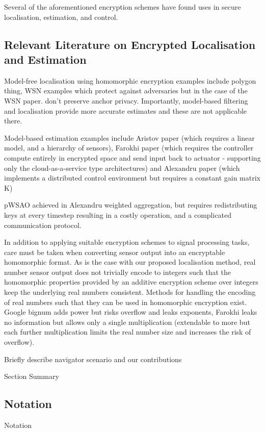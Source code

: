 \documentclass[twocolumn]{autart}    %
\begin{document}
Several of the aforementioned encryption schemes have found uses in secure localisation, estimation, and control.

\subsection{Relevant Literature on Encrypted Localisation and Estimation}

Model-free localisation using homomorphic encryption examples include polygon thing, WSN examples which protect against adversaries but in the case of the WSN paper. don't preserve anchor privacy. Importantly, model-based filtering and localisation provide more accurate estimates and these are not applicable there.

Model-based estimation examples include Aristov paper (which requires a linear model, and a hierarchy of sensors), Farokhi paper (which requires the controller compute entirely in encrypted space and send input back to actuator - supporting only the cloud-as-a-service type architectures) and Alexandru paper (which implements a distributed control environment but requires a constant gain matrix K)

pWSAO achieved in Alexandru weighted aggregation, but requires redistributing keys at every timestep resulting in a costly operation, and a complicated communication protocol.

In addition to applying suitable encryption schemes to signal processing tasks, care must be taken when converting sensor output into an encryptable homomorphic format. As is the case with our proposed localisation method, real number sensor output does not trivially encode to integers such that the homomorphic properties provided by an additive encryption scheme over integers keep the underlying real numbers consistent. Methods for handling the encoding of real numbers such that they can be used in homomorphic encryption exist. Google bignum adds power but risks overflow and leaks exponents, Farokhi leaks no information but allows only a single multiplication (extendable to more but each further multiplication limits the real number size and increases the risk of overflow).

Briefly describe navigator scenario and our contributions

Section Summary

\subsection{Notation}
Notation
\end{document}

